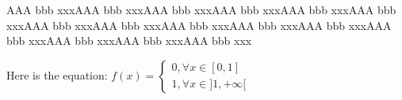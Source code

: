 \documentclass[10pt,a4paper]{article}
\author{Ludovic}
\begin{document}
AAA bbb xxxAAA bbb xxxAAA bbb xxxAAA bbb xxxAAA bbb xxxAAA bbb xxxAAA bbb xxxAAA bbb xxxAAA bbb xxxAAA bbb xxxAAA bbb xxxAAA bbb xxxAAA bbb xxxAAA bbb xxxAAA bbb xxx


Here is the equation: $f(x) = \left\lbrace
\begin{split}
0, \forall x \in [0, 1] \\
1, \forall x \in ]1, +\infty[
\end{split}\right.$
\end{document}
